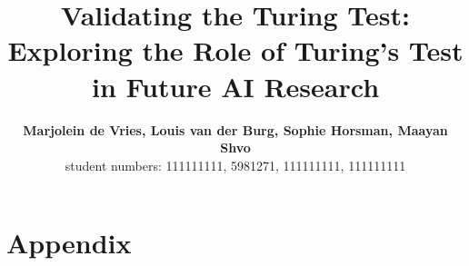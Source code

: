 \documentclass[10pt,letterpaper]{article}
\title{Validating the Turing Test: Exploring the Role of Turing’s Test in Future AI Research}
\author{{\large \bf Marjolein de Vries, Louis van der Burg, Sophie Horsman, Maayan Shvo} \\
   student numbers: 111111111, 5981271, 111111111, 111111111 \\
}
\begin{document}
\maketitle













\setlength{\bibleftmargin}{.125in}
\setlength{\bibindent}{-\bibleftmargin}



\section{Appendix}
   
   
   
\end{document}
